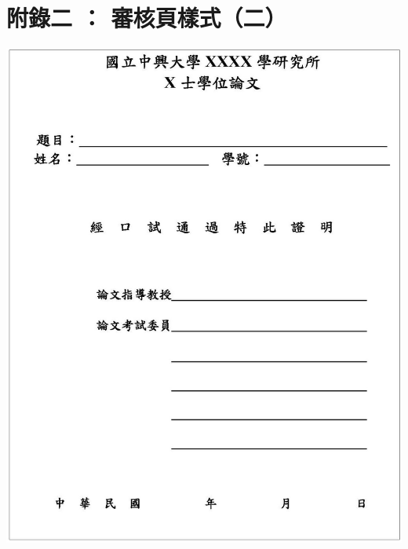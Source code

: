 \documentclass[12pt,oneside,openany,a4paper]{book}
\begin{document}
\chapter{附錄二 ： 審核頁樣式（二）}
    \begin{center}
        \includegraphics[bb=0 0 1224 1527,width=\textwidth]{examine2.jpg}
    \end{center}
\end{document}
